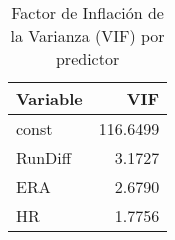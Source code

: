 \begin{table}
\caption{Factor de Inflación de la Varianza (VIF) por predictor}
\label{tab:ols_multiple_vif}
\begin{tabular}{lr}
\toprule
Variable & VIF \\
\midrule
const & 116.6499 \\
RunDiff & 3.1727 \\
ERA & 2.6790 \\
HR & 1.7756 \\
\bottomrule
\end{tabular}
\end{table}

